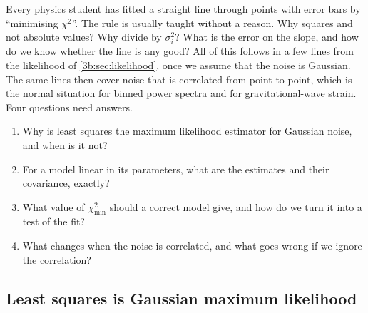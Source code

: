 Every physics student has fitted a straight line through points with error
bars by ``minimising $\chi^2$''. The rule is usually taught without a
reason. Why squares and not absolute values? Why divide by $\sigma_i^2$?
What is the error on the slope, and how do we know whether the line is any
good? All of this follows in a few lines from the likelihood of
\cref{3b:sec:likelihood}, once we assume that the noise is Gaussian. The
same lines then cover noise that is correlated from point to point, which
is the normal situation for binned power spectra and for gravitational-wave
strain. Four questions need answers.
\begin{enumerate}[label=\arabic*.]
  \item Why is least squares the maximum likelihood estimator for Gaussian
        noise, and when is it not?
  \item For a model linear in its parameters, what are the estimates and
        their covariance, exactly?
  \item What value of $\chi^2_{\min}$ should a correct model give, and how
        do we turn it into a test of the fit?
  \item What changes when the noise is correlated, and what goes wrong if
        we ignore the correlation?
\end{enumerate}

\subsection{Least squares is Gaussian maximum likelihood}
\label{3b:sec:ls-from-ml}


